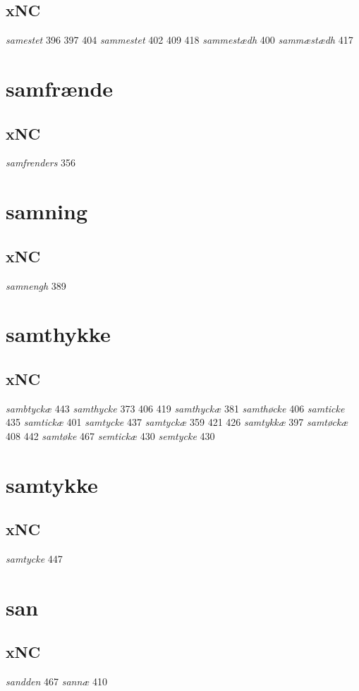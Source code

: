 \documentclass[a4paper,twocolumn]{article}
\begin{document}
\subsection{xNC}
\label{sec:orge68f407}
\emph{samestet} 396 397 404 \emph{sammestet} 402 409 418 \emph{sammestædh} 400 \emph{sammæstædh} 417 
\section{samfrænde}
\label{sec:org9d3cd90}
\subsection{xNC}
\label{sec:org2699e1a}
\emph{samfrenders} 356 
\section{samning}
\label{sec:org936b7f3}
\subsection{xNC}
\label{sec:org2ceecd8}
\emph{samnengh} 389 
\section{samthykke}
\label{sec:orgbfe7af4}
\subsection{xNC}
\label{sec:org3a7af61}
\emph{sambtyckæ} 443 \emph{samthycke} 373 406 419 \emph{samthyckæ} 381 \emph{samthøcke} 406 \emph{samticke} 435 \emph{samtickæ} 401 \emph{samtycke} 437 \emph{samtyckæ} 359 421 426 \emph{samtykkæ} 397 \emph{samtøckæ} 408 442 \emph{samtøke} 467 \emph{semtickæ} 430 \emph{semtycke} 430 
\section{samtykke}
\label{sec:org6295dd4}
\subsection{xNC}
\label{sec:orgfc1bf72}
\emph{samtycke} 447 
\section{san}
\label{sec:org2164be2}
\subsection{xNC}
\label{sec:orga7b2016}
\emph{sandden} 467 \emph{sannæ} 410 
\end{document}
